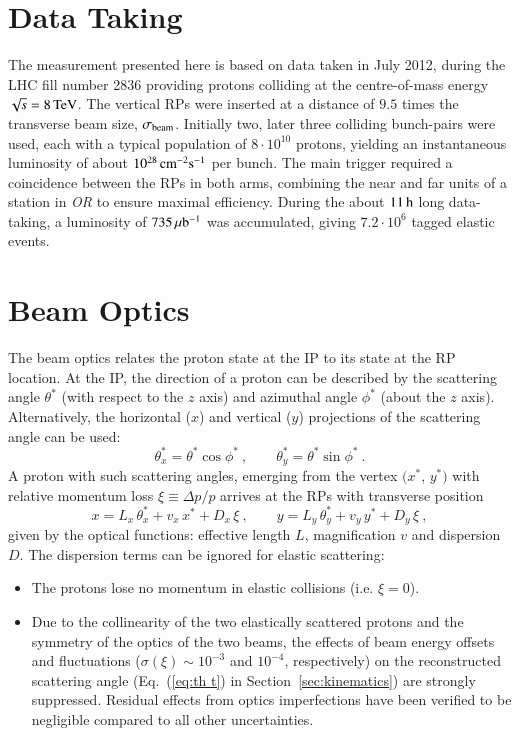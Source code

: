 \section{Data Taking}
\label{sec:data taking}

The measurement presented here is based on data taken in July 2012, during the LHC fill number 2836 providing protons colliding at the centre-of-mass energy $\sqrt s = 8\,{\rm TeV}$. The vertical RPs were inserted at a distance of $9.5$ times the transverse beam size, $\sigma_{\rm beam}$. Initially two, later three colliding bunch-pairs were used, each with a typical population of $8\cdot10^{10}$ protons, yielding an instantaneous luminosity of about $10^{28}\,{\rm cm^{-2}s^{-1}}$ per bunch. The main trigger required a coincidence between the RPs in both arms, combining the near and far units of a station in \textit{OR} to ensure maximal efficiency. During the about $11\,{\rm h}$ long data-taking, a luminosity of $735\,{\rm \mu b^{-1}}$ was accumulated, giving $7.2\cdot 10^6$ tagged elastic events.



\section{Beam Optics}
\label{sec:beam optics}

The beam optics relates the proton state at the IP to its state at the RP location. At the IP, the direction of a proton can be described by the scattering angle $\theta^*$ (with respect to the $z$ axis) and azimuthal angle $\phi^*$ (about the $z$ axis). Alternatively, the horizontal ($x$) and vertical ($y$) projections of the scattering angle can be used:
\begin{equation}
\label{eq:scatt angle}
\theta_x^* = \theta^* \cos\phi^*\ ,\qquad \theta_y^* = \theta^* \sin\phi^*\ .
\end{equation}
A proton with such scattering angles, emerging from the vertex $(x^*$, $y^*)$ with relative momentum loss $\xi \equiv \Delta p / p$ arrives at the RPs with transverse position
\begin{equation}
\label{eq:prot trans}
	x = L_x\, \theta_x^* + v_x\, x^* + D_x\, \xi\ ,\qquad y = L_y\, \theta_y^* + v_y\, y^* + D_y\, \xi\ ,
\end{equation}
given by the optical functions: effective length $L$, magnification $v$ and dispersion $D$. The dispersion terms can be ignored for elastic scattering: 
\begin{itemize}
\item The protons lose no momentum in elastic collisions 
(i.e. $\xi = 0$).
\item Due to the collinearity of the two elastically scattered protons and 
the symmetry of the optics of the two beams, the effects of 
beam energy offsets and fluctuations ($\sigma(\xi) \sim 10^{-3}$ and $10^{-4}$, 
respectively) on the reconstructed scattering angle (Eq.~(\ref{eq:th t}) in 
Section~\ref{sec:kinematics})
are strongly suppressed. Residual effects from optics imperfections have
been verified to be negligible compared to all other uncertainties.
\end{itemize}


